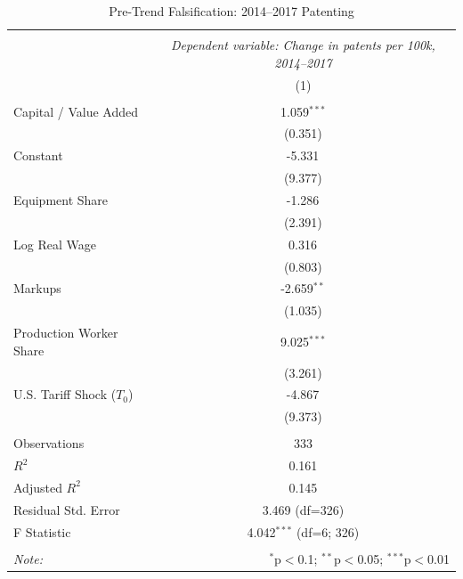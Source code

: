 \begin{table}[!htbp] \centering
  \caption{Pre-Trend Falsification: 2014--2017 Patenting}
  \label{tab:innovation_pretrend}
\begin{tabular}{@{\extracolsep{5pt}}lc}
\\[-1.8ex]\hline
\hline \\[-1.8ex]
& \multicolumn{1}{c}{\textit{Dependent variable: Change in patents per 100k, 2014--2017}} \
\cr \cline{2-2}
\\[-1.8ex] & (1) \\
\hline \\[-1.8ex]
 Capital / Value Added & 1.059$^{***}$ \\
& (0.351) \\
 Constant & -5.331$^{}$ \\
& (9.377) \\
 Equipment Share & -1.286$^{}$ \\
& (2.391) \\
 Log Real Wage & 0.316$^{}$ \\
& (0.803) \\
 Markups & -2.659$^{**}$ \\
& (1.035) \\
 Production Worker Share & 9.025$^{***}$ \\
& (3.261) \\
 U.S. Tariff Shock ($T_0$) & -4.867$^{}$ \\
& (9.373) \\
\hline \\[-1.8ex]
 Observations & 333 \\
 $R^2$ & 0.161 \\
 Adjusted $R^2$ & 0.145 \\
 Residual Std. Error & 3.469 (df=326) \\
 F Statistic & 4.042$^{***}$ (df=6; 326) \\
\hline
\hline \\[-1.8ex]
\textit{Note:} & \multicolumn{1}{r}{$^{*}$p$<$0.1; $^{**}$p$<$0.05; $^{***}$p$<$0.01} \\
\end{tabular}
\end{table}